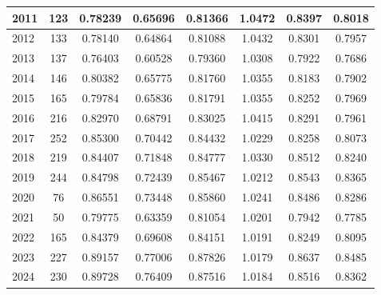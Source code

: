 \documentclass[11pt]{article}
\begin{document}
\begin{table}[htbp]
{\begin{tabular}{|l|c|c|c|c|c|c|c|}
2011 & 123 & 0.78239 & 0.65696 & 0.81366 & 1.0472 & 0.8397 & 0.8018\\ \hline 
2012 & 133 & 0.78140 & 0.64864 & 0.81088 & 1.0432 & 0.8301 & 0.7957\\ \hline 
2013 & 137 & 0.76403 & 0.60528 & 0.79360 & 1.0308 & 0.7922 & 0.7686\\ \hline 
2014 & 146 & 0.80382 & 0.65775 & 0.81760 & 1.0355 & 0.8183 & 0.7902\\ \hline 
2015 & 165 & 0.79784 & 0.65836 & 0.81791 & 1.0355 & 0.8252 & 0.7969\\ \hline 
2016 & 216 & 0.82970 & 0.68791 & 0.83025 & 1.0415 & 0.8291 & 0.7961\\ \hline 
2017 & 252 & 0.85300 & 0.70442 & 0.84432 & 1.0229 & 0.8258 & 0.8073\\ \hline 
2018 & 219 & 0.84407 & 0.71848 & 0.84777 & 1.0330 & 0.8512 & 0.8240\\ \hline 
2019 & 244 & 0.84798 & 0.72439 & 0.85467 & 1.0212 & 0.8543 & 0.8365\\ \hline 
2020 & 76 & 0.86551 & 0.73448 & 0.85860 & 1.0241 & 0.8486 & 0.8286\\ \hline 
2021 & 50 & 0.79775 & 0.63359 & 0.81054 & 1.0201 & 0.7942 & 0.7785\\ \hline 
2022 & 165 & 0.84379 & 0.69608 & 0.84151 & 1.0191 & 0.8249 & 0.8095\\ \hline 
2023 & 227 & 0.89157 & 0.77006 & 0.87826 & 1.0179 & 0.8637 & 0.8485\\ \hline 
2024 & 230 & 0.89728 & 0.76409 & 0.87516 & 1.0184 & 0.8516 & 0.8362\\ \hline 
\end{tabular}
}
\end{table}
\end{document}
